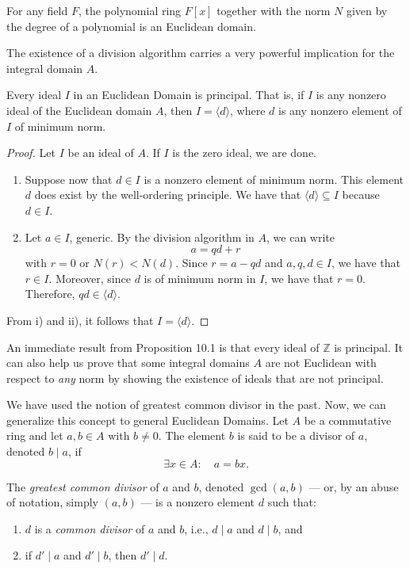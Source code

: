 \documentclass[11pt,a4paper]{article}
\begin{document}
\begin{exa}
For any field $F$, the polynomial ring $F[x]$ together with the norm $N$ given by the degree of a polynomial is an Euclidean domain.
\end{exa}

The existence of a division algorithm carries a very powerful implication for the integral domain $A$.


\begin{prop}[10.1]
Every ideal $I$ in an Euclidean Domain is principal. That is, if $I$ is any nonzero ideal of the Euclidean domain $A$, then $I = \langle d \rangle$, where $d$ is any nonzero element of $I$ of minimum norm.
\end{prop}

\begin{proof}
Let $I$ be an ideal of $A$. If $I$ is the zero ideal, we are done.

\begin{enumerate}[label=(\roman*)]
    \item Suppose now that $d \in I$ is a nonzero element of minimum norm. This element $d$ does exist by the well-ordering principle. We have that $\langle d \rangle \subseteq I$ because $d \in I$.
    
    \item Let $a \in I$, generic. By the division algorithm in $A$, we can write
    \[
    a = qd + r
    \]
    with $r = 0$ or $N(r) < N(d)$. Since $r = a - qd$ and $a, q, d \in I$, we have that $r \in I$. Moreover, since $d$ is of minimum norm in $I$, we have that $r = 0$. Therefore, $qd \in \langle d \rangle$.
\end{enumerate}

From i) and ii), it follows that $I = \langle d \rangle$.
\end{proof}

An immediate result from Proposition 10.1 is that every ideal of $\mathbb{Z}$ is principal. It can also help us prove that some integral domains $A$ are not Euclidean with respect to \textit{any} norm by showing the existence of ideals that are not principal.

We have used the notion of greatest common divisor in the past. Now, we can generalize this concept to general Euclidean Domains. Let $A$ be a commutative ring and let $a, b \in A$ with $b \neq 0$. The element $b$ is said to be a divisor of $a$, denoted $b \mid a$, if
\[
\exists x \in A : \quad a = bx.
\]

The \textit{greatest common divisor} of $a$ and $b$, denoted $\gcd(a, b)$ — or, by an abuse of notation, simply $(a, b)$ — is a nonzero element $d$ such that:
\begin{enumerate}[label=(\roman*)]
    \item $d$ is a \textit{common divisor} of $a$ and $b$, i.e., $d \mid a$ and $d \mid b$, and
    \item if $d' \mid a$ and $d' \mid b$, then $d' \mid d$.
\end{enumerate}
\end{document}
